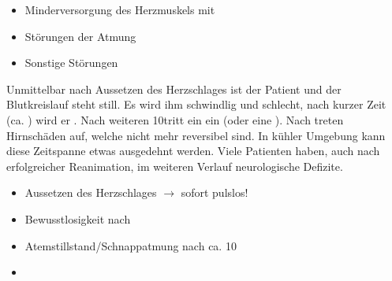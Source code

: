 {
\begin{itemize}
  \item Minderversorgung des Herzmuskels mit \par
  \item Störungen der Atmung\par
  \item Sonstige Störungen\par
\end{itemize}
}{}{}{}{}

{Unmittelbar nach Aussetzen des Herzschlages ist der Patient
 und der Blutkreislauf steht still. Es wird ihm
schwindlig und schlecht, nach kurzer Zeit (ca.
\Sek*) wird er . Nach weiteren
10\Sek* tritt ein  ein (oder eine
).
Nach \Min* treten Hirnschäden auf, welche nicht
mehr reversibel sind. In kühler Umgebung kann diese
Zeitspanne etwas ausgedehnt werden.
Viele Patienten haben, auch nach erfolgreicher Reanimation,
im weiteren Verlauf neurologische Defizite.
}{
\begin{itemize}
  \item Aussetzen des Herzschlages $\rightarrow$ 
  sofort pulslos!
  \item[\Sign{→}] Bewusstlosigkeit nach \Sek*
  \item[\Sign{→}] Atemstillstand/Schnappatmung nach ca. 10\Sek*
  \item[\Sign{→}] 
\end{itemize}

}{}{}{}




